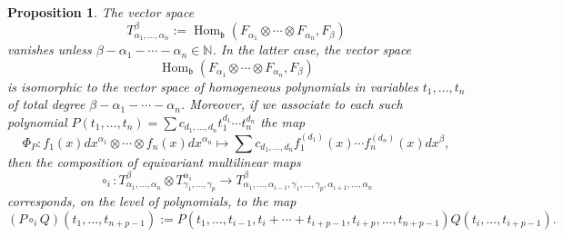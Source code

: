 \documentclass[11pt,reqno]{amsart}
\theoremstyle{plain}
\newtheorem{proposition}[theorem]{Proposition}
\theoremstyle{definition}
\theoremstyle{remark}
\DeclareMathOperator{\Hom}{Hom}
\begin{document}
\begin{proposition}\label{prop:borel-inv}
The vector space
\begin{equation}\label{eq:borel-inv}
T_{\alpha_1,\ldots,\alpha_n}^\beta:=\Hom_{\mathfrak{b}}(F_{\alpha_1}\otimes\cdots\otimes F_{\alpha_n},F_\beta)   
\end{equation}
vanishes unless $\beta-\alpha_1-\cdots-\alpha_n\in\mathbb{N}$. In the latter case, the vector space
 \[
\Hom_{\mathfrak{b}}(F_{\alpha_1}\otimes\cdots\otimes F_{\alpha_n},F_\beta)  
 \]
is isomorphic to the vector space of homogeneous polynomials in variables $t_1,\ldots,t_n$ of total degree $\beta-\alpha_1-\cdots-\alpha_n$.
Moreover, if we associate to each such polynomial $P(t_1,\ldots,t_n)=\sum c_{d_1,\ldots,d_n}t_1^{d_1}\cdots t_n^{d_n}$ the map 
\begin{equation}\label{eq:difop}
\Phi_P\colon f_1(x)dx^{\alpha_1}\otimes\cdots\otimes f_n(x)dx^{\alpha_n}\mapsto 
\sum c_{d_1,\ldots,d_n} f_1^{(d_1)}(x)\cdots f_n^{(d_n)}(x)dx^\beta,   
\end{equation}
then the composition of equivariant multilinear maps
\begin{equation}
\circ_i \colon T_{\alpha_1,\ldots,\alpha_n}^\beta\otimes T_{\gamma_1,\ldots,\gamma_p}^{\alpha_i}\to T_{\alpha_1,\ldots,\alpha_{i-1},\gamma_1,\ldots,\gamma_p,\alpha_{i+1},\ldots,\alpha_n}^\beta
\end{equation}
corresponds, on the level of polynomials, to the map
\begin{equation}\label{eq:comp-borel-inv}
(P\circ_i Q)(t_1,\ldots,t_{n+p-1}):=P(t_1,\ldots,t_{i-1},t_i+\cdots+t_{i+p-1},t_{i+p},\ldots,t_{n+p-1})Q(t_i,\ldots,t_{i+p-1}).
\end{equation}
\end{proposition}
\end{document}
